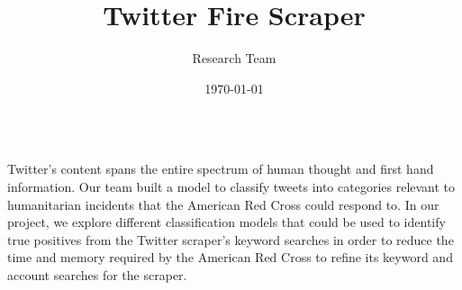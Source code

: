 \documentclass[
blockverticalspace=-0.75cm
]{tikzposter}
\title{\fontsize{44pt}{18pt}
    Twitter Fire Scraper}
\author{Research Team}
\date{\today}
\institute{Illinois Institute of Technology}
\begin{document}
\maketitle

\begin{columns}

\vspace{-2cm}
{
    {
    \fontsize{46pt}{20pt}\selectfont
    Twitter's content spans the entire spectrum of human thought and first hand information. Our team built a model to classify tweets into categories relevant to humanitarian incidents that the American Red Cross could respond to. In our project, we explore different classification models that could be used to identify true positives from the Twitter scraper's keyword searches in order to reduce the time and memory required by the American Red Cross to refine its keyword and account searches for the scraper.       
    }
}


\end{columns}

\vspace{-1cm}
\end{document}
